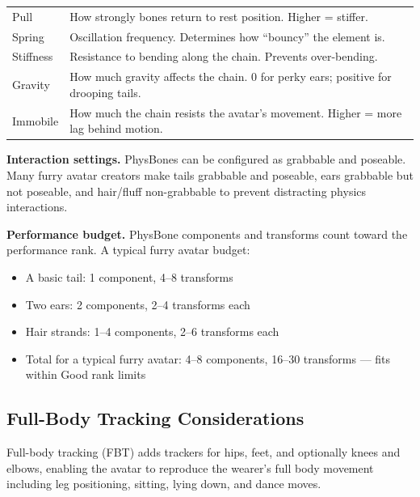 \begin{center}
\begin{tabularx}{\textwidth}{L{2.5cm}X}
\toprule
{}
 &  \\
\midrule
Pull & How strongly bones return to rest position. Higher = stiffer. \\
Spring & Oscillation frequency. Determines how ``bouncy'' the element is. \\
Stiffness & Resistance to bending along the chain. Prevents over-bending. \\
Gravity & How much gravity affects the chain. 0 for perky ears; positive for drooping tails. \\
Immobile & How much the chain resists the avatar's movement. Higher = more lag behind motion. \\
\bottomrule
\end{tabularx}
\end{center}

\textbf{Interaction settings.} PhysBones can be configured as grabbable and poseable. Many furry avatar creators make tails grabbable and poseable, ears grabbable but not poseable, and hair/fluff non-grabbable to prevent distracting physics interactions.

\textbf{Performance budget.} PhysBone components and transforms count toward the performance rank. A typical furry avatar budget:

\begin{itemize}[leftmargin=2em]
  \item A basic tail: 1 component, 4--8 transforms
  \item Two ears: 2 components, 2--4 transforms each
  \item Hair strands: 1--4 components, 2--6 transforms each
  \item Total for a typical furry avatar: 4--8 components, 16--30 transforms --- fits within Good rank limits
\end{itemize}


\subsection{Full-Body Tracking Considerations}

Full-body tracking (FBT) adds trackers for hips, feet, and optionally knees and elbows, enabling the avatar to reproduce the wearer's full body movement including leg positioning, sitting, lying down, and dance moves.


